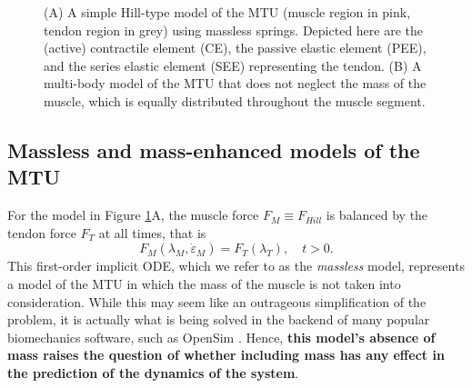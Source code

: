 \documentclass{sfuthesis}
\numberwithin{equation}{chapter}
\numberwithin{figure}{chapter}
\numberwithin{table}{chapter}
\theoremstyle{definition}
\newcommand{\depsilon}{\dot{\varepsilon}}
\begin{document}
\begin{figure}
    \caption{(A) A simple Hill-type model of the MTU (muscle region in pink, tendon region in grey) using massless springs. Depicted here are the (active) contractile element (CE), the passive elastic element (PEE), and the series elastic element (SEE) representing the tendon. (B) A multi-body model of the MTU that does not neglect the mass of the muscle, which is equally distributed throughout the muscle segment.}
    \label{fig:muscle_models_1D}
\end{figure}

    
    

    


\subsection{Massless and mass-enhanced models of the MTU}

For the model in Figure \ref{fig:muscle_models_1D}A, the muscle force $F_M \equiv F_{Hill}$ is balanced by the tendon force $F_T$ at all times, that is
\begin{equation} \label{eq:massless_model}
    F_M(\lambda_M, \depsilon_M) = F_T(\lambda_T), \quad t > 0.
\end{equation}
This first-order implicit ODE, which we refer to as the \textit{massless} model, represents a model of the MTU in which the mass of the muscle is not taken into consideration. While this may seem like an outrageous simplification of the problem, it is actually what is being solved in the backend of many popular biomechanics software, such as OpenSim \cite{Delp2007OpenSim}. Hence, \textbf{this model's absence of mass raises the question of whether including mass has any effect in the prediction of the dynamics of the system}. 
\end{document}
